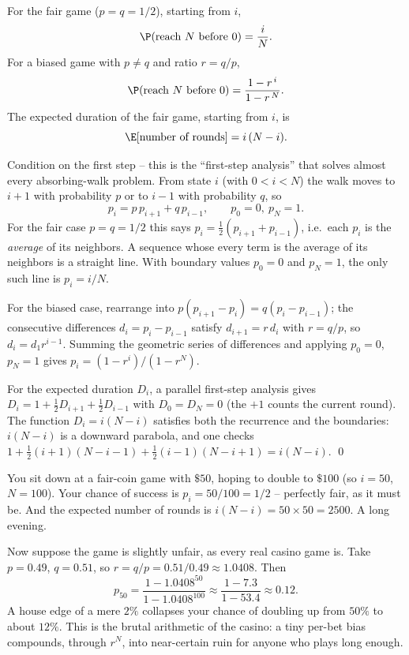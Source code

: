 \begin{theorem}
\label{ch26:thm-ruin}
For the fair game ($p = q = 1/2$), starting from $i$,
\[
  \P(\text{reach } N \text{ before } 0) = \frac{i}{N}.
\]
For a biased game with $p \ne q$ and ratio $r = q/p$,
\[
  \P(\text{reach } N \text{ before } 0) = \frac{1 - r^{\,i}}{1 - r^{\,N}}.
\]
The expected duration of the fair game, starting from $i$, is
\[
  \E[\text{number of rounds}] = i\,(N - i).
\]
\end{theorem}

\begin{whybox}
Condition on the first step -- this is the ``first-step analysis'' that solves
almost every absorbing-walk problem. From state $i$ (with $0 < i < N$) the walk
moves to $i+1$ with probability $p$ or to $i-1$ with probability $q$, so
\[
  p_i = p\,p_{i+1} + q\,p_{i-1}, \qquad p_0 = 0,\ p_N = 1.
\]
For the fair case $p = q = 1/2$ this says $p_i = \tfrac{1}{2}(p_{i+1} +
p_{i-1})$, i.e.\ each $p_i$ is the \emph{average} of its neighbors. A sequence
whose every term is the average of its neighbors is a straight line. With
boundary values $p_0 = 0$ and $p_N = 1$, the only such line is $p_i = i/N$.

For the biased case, rearrange into $p(p_{i+1} - p_i) = q(p_i - p_{i-1})$; the
consecutive differences $d_i = p_i - p_{i-1}$ satisfy $d_{i+1} = r\,d_i$ with
$r = q/p$, so $d_i = d_1 r^{i-1}$. Summing the geometric series of differences
and applying $p_0 = 0$, $p_N = 1$ gives $p_i = (1 - r^i)/(1 - r^N)$.

For the expected duration $D_i$, a parallel first-step analysis gives
$D_i = 1 + \tfrac{1}{2}D_{i+1} + \tfrac{1}{2}D_{i-1}$ with $D_0 = D_N = 0$
(the $+1$ counts the current round). The function $D_i = i(N-i)$ satisfies both
the recurrence and the boundaries: $i(N-i)$ is a downward parabola, and one
checks $1 + \tfrac12(i{+}1)(N{-}i{-}1) + \tfrac12(i{-}1)(N{-}i{+}1) = i(N-i)$.
\qed
\end{whybox}

\begin{example}
\label{ch26:ex-ruin}
You sit down at a fair-coin game with $\$50$, hoping to double to $\$100$
(so $i = 50$, $N = 100$). Your chance of success is $p_i = 50/100 = 1/2$ --
perfectly fair, as it must be. And the expected number of rounds is $i(N-i) =
50 \times 50 = 2500$. A long evening.

Now suppose the game is slightly unfair, as every real casino game is. Take
$p = 0.49$, $q = 0.51$, so $r = q/p = 0.51/0.49 \approx 1.0408$. Then
\[
  p_{50} = \frac{1 - 1.0408^{50}}{1 - 1.0408^{100}}
  \approx \frac{1 - 7.3}{1 - 53.4} \approx 0.12.
\]
A house edge of a mere $2\%$ collapses your chance of doubling up from $50\%$ to
about $12\%$. This is the brutal arithmetic of the casino: a tiny per-bet bias
compounds, through $r^N$, into near-certain ruin for anyone who plays long
enough.
\end{example}

